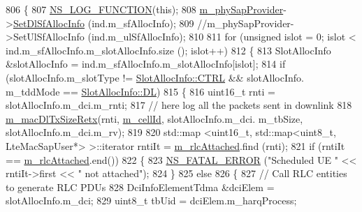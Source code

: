 \begin{DoxyCode}
806 \{
807         \hyperlink{log-macros-disabled_8h_a90b90d5bad1f39cb1b64923ea94c0761}{NS\_LOG\_FUNCTION}(\textcolor{keyword}{this});
808         \hyperlink{classns3_1_1MmWaveEnbMac_a0bfb3ea8d3d00e3c92ac3a554602d40b}{m\_phySapProvider}->\hyperlink{classns3_1_1MmWavePhySapProvider_a73dc14a264cf1972e2047d85f7ce3771}{SetDlSfAllocInfo} (ind.m\_sfAllocInfo);
809         \textcolor{comment}{//m\_phySapProvider->SetUlSfAllocInfo (ind.m\_ulSfAllocInfo);}
810 
811         \textcolor{keywordflow}{for} (\textcolor{keywordtype}{unsigned} islot = 0; islot < ind.m\_sfAllocInfo.m\_slotAllocInfo.size (); islot++)
812         \{
813                 SlotAllocInfo &slotAllocInfo = ind.m\_sfAllocInfo.m\_slotAllocInfo[islot];
814                 \textcolor{keywordflow}{if} (slotAllocInfo.m\_slotType != \hyperlink{structns3_1_1SlotAllocInfo_a3ea7cb503bfd0c9a4df55a71b81b9331ad78b7d76ef82d56c33be1fa9c1867409}{SlotAllocInfo::CTRL} && slotAllocInfo.
      m\_tddMode == \hyperlink{structns3_1_1SlotAllocInfo_a6cad60db1d39034f1851e2cea625fe5da9a365c9c56b7c32dcae38ee1a468ce6d}{SlotAllocInfo::DL})
815                 \{
816                         uint16\_t rnti = slotAllocInfo.m\_dci.m\_rnti;
817                         \textcolor{comment}{// here log all the packets sent in downlink }
818                         \hyperlink{classns3_1_1MmWaveEnbMac_a032e682229bff1f0d54f28c700a7f67d}{m\_macDlTxSizeRetx}(rnti, \hyperlink{classns3_1_1MmWaveEnbMac_af44d2a225c1426897f84b74ed2a94afb}{m\_cellId}, slotAllocInfo.m\_dci.
      m\_tbSize, slotAllocInfo.m\_dci.m\_rv);
819 
820                         std::map <uint16\_t, std::map<uint8\_t, LteMacSapUser*> >::iterator rntiIt = 
      \hyperlink{classns3_1_1MmWaveEnbMac_a13e4bafd30f3edae1f5dc1192c9b3011}{m\_rlcAttached}.find (rnti);
821                         \textcolor{keywordflow}{if} (rntiIt == \hyperlink{classns3_1_1MmWaveEnbMac_a13e4bafd30f3edae1f5dc1192c9b3011}{m\_rlcAttached}.end())
822                         \{
823                                 \hyperlink{group__fatal_ga5131d5e3f75d7d4cbfd706ac456fdc85}{NS\_FATAL\_ERROR} (\textcolor{stringliteral}{"Scheduled UE "} << rntiIt->first << \textcolor{stringliteral}{" not
       attached"});
824                         \}
825                         \textcolor{keywordflow}{else}
826                         \{
827                                 \textcolor{comment}{// Call RLC entities to generate RLC PDUs}
828                                 DciInfoElementTdma &dciElem = slotAllocInfo.m\_dci;
829                                 uint8\_t tbUid = dciElem.m\_harqProcess;

\end{DoxyCode}
